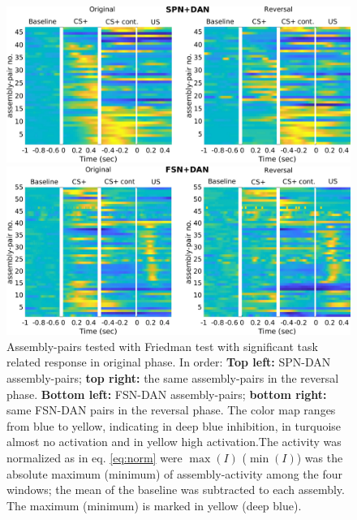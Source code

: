  \begin{figure}[H]
     \centering
     \includegraphics[scale=0.42]{figures/SPN_DAN.pdf}
     
     \vspace{1cm}
     
     \includegraphics[scale=0.42]{figures/HeatFSN_DAN.pdf}
     \caption{Assembly-pairs tested with Friedman test with significant task related response in original phase. In order: \textbf{Top left:} SPN-DAN assembly-pairs; \textbf{top right:} the same assembly-pairs in the reversal phase. \textbf{Bottom left:} FSN-DAN assembly-pairs; \textbf{bottom right:} same FSN-DAN pairs in the reversal phase. The color map ranges from blue to yellow, indicating in deep blue inhibition, in turquoise almost no activation and in yellow high activation.The activity was normalized as in eq. \ref{eq:norm} were $\max(I)$ ($\min(I)$) was the absolute maximum (minimum) of assembly-activity among the four windows; the mean of the baseline was subtracted to each assembly. The maximum (minimum) is marked in yellow (deep blue).}
     \label{fig:HeatPairsDan}
 \end{figure}
